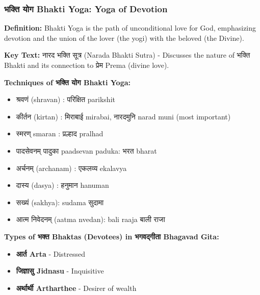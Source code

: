 \begin{frame}[fragile]\frametitle{भक्ति  योग Bhakti Yoga: Yoga of Devotion}
    \textbf{Definition:} Bhakti Yoga is the path of unconditional love for God, emphasizing devotion and the union of the lover (the yogi) with the beloved (the Divine).

    
    \textbf{Key Text:} नारद भक्ति सूत्र (Narada Bhakti Sutra) - Discusses the nature of भक्ति Bhakti and its connection to प्रेम Prema (divine love).

    
    \textbf{Techniques of भक्ति  योग Bhakti Yoga:}
    \begin{itemize}
        \item श्रवणं (shravan) : परिक्षित  parikshit
        \item कीर्तन (kirtan) : मिराबाई  mirabai, नारदमुनि narad muni (most important)
        \item स्मरण् smaran : प्रल्हाद  pralhad   
        \item पादसेवनम् पादुका paadsevan paduka: भरत bharat
        \item अर्चनम् (archanam) : एकलव्य ekalavya
        \item दास्य (dasya) : हनुमान hanuman
        \item सख्यं  (sakhya): sudama सुदामा
        \item आत्म निवेदनम् (aatma nvedan): bali raaja बाली राजा
    \end{itemize}

    
    \textbf{Types of भक्त  Bhaktas (Devotees) in भगवद्गीता  Bhagavad Gita:}
    \begin{itemize}
        \item \textbf{आर्त  Arta} - Distressed
        \item \textbf{जिज्ञासु Jidnasu} - Inquisitive
        \item \textbf{अर्थार्थी Artharthee} - Desirer of wealth
    \end{itemize}
\end{frame}

